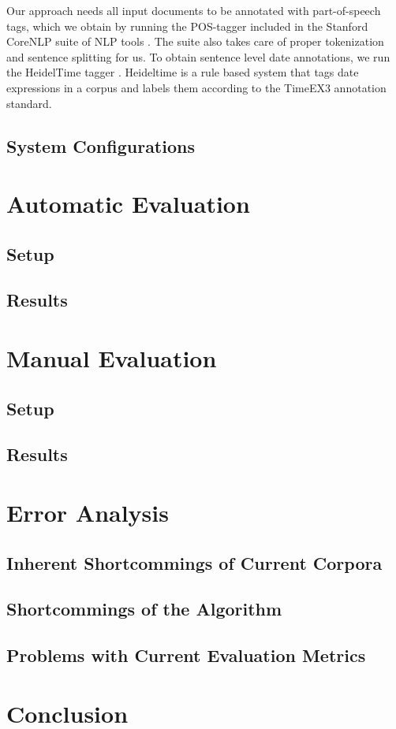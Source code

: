 \documentclass[a4paper,BCOR=10mm]{report}
\begin{document}
Our approach needs all input documents to be annotated with part-of-speech tags, which we obtain by running the POS-tagger included in the Stanford CoreNLP suite of NLP tools \citep{stanford-corenlp}. The suite also takes care of proper tokenization and sentence splitting for us.
To obtain sentence level date annotations, we run the HeidelTime tagger \citet{heideltime}. Heideltime is a rule based system that tags date expressions in a corpus and labels them according to the TimeEX3 annotation standard.

\section{System Configurations}


\chapter{Automatic Evaluation}

\section{Setup}

\section{Results}

\chapter{Manual Evaluation}

\section{Setup}

\section{Results}

\chapter{Error Analysis}

\section{Inherent Shortcommings of Current Corpora}

\section{Shortcommings of the Algorithm}

\section{Problems with Current Evaluation Metrics}

\chapter{Conclusion}
\end{document}

